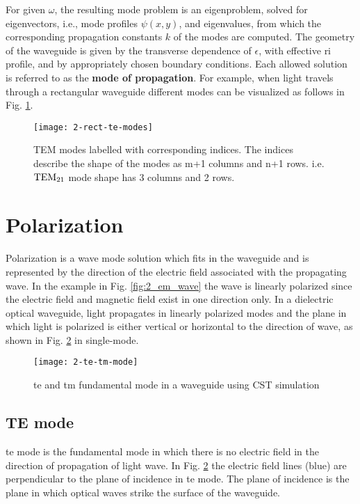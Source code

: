 \documentclass[../report.tex]{subfiles}
\begin{document}
For given $\omega$, the resulting mode problem is an eigenproblem, solved for eigenvectors, i.e., mode profiles $\psi(x, y)$, and eigenvalues, from which the corresponding propagation constants $k$ of the modes are computed. The geometry of the waveguide is given by the transverse dependence of $\epsilon$, with effective \gls{ri} profile, and by appropriately chosen boundary conditions. Each allowed solution is referred to as the \textbf{mode of propagation}. For example, when light travels through a rectangular waveguide different modes can be visualized as follows in Fig. \ref{fig:2_rect_te_modes}.
\begin{figure}[H]
	\centering
	\texttt{[image: 2-rect-te-modes]}
	\caption{TEM modes labelled with corresponding indices. The indices describe the shape of the modes as m+1 columns and n+1 rows. i.e. $\mathrm{TEM_{21}}$ mode shape has 3 columns and 2 rows.
	\label{fig:2_rect_te_modes}}
\end{figure}
		
		\section{Polarization}
Polarization is a wave mode solution which fits in the waveguide and is represented by the direction of the electric field associated with the propagating wave. In the example in Fig. \ref{fig:2_em_wave} the wave is linearly polarized since the electric field and magnetic field exist in one direction only. In a dielectric optical waveguide, light propagates in linearly polarized modes and the plane in which light is polarized is either vertical or horizontal to the direction of wave, as shown in Fig. \ref{fig:2_te_tm_mode} in single-mode.

	\begin{figure}[H]
		\centering
		\texttt{[image: 2-te-tm-mode]}
		\caption{\gls{te} and \gls{tm} fundamental mode in a waveguide using CST simulation}
		\label{fig:2_te_tm_mode}
	\end{figure}	
			\subsection{TE mode}
\gls{te} mode is the fundamental mode in which there is no electric field in the direction of propagation of light wave. In Fig. \ref{fig:2_te_tm_mode} the electric field lines (blue) are perpendicular to the plane of incidence in \gls{te} mode. The plane of incidence is the plane in which optical waves strike the surface of the waveguide.						
\end{document}
